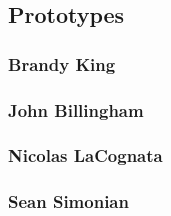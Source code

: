 \subsection{Prototypes}
\subsubsection{Brandy King}

\subsubsection{John Billingham}

\subsubsection{Nicolas LaCognata}

\subsubsection{Sean Simonian}

